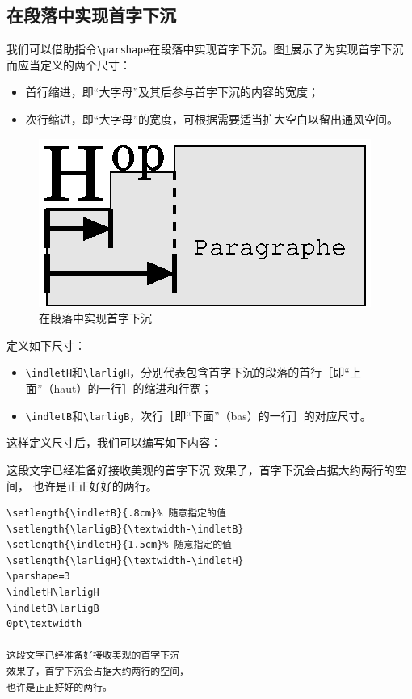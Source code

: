 \subsection{在段落中实现首字下沉}

我们可以借助指令\verb|\parshape|在段落中实现首字下沉。图\ref{fig:11.3}展示了为实现首字下沉而应当定义的两个尺寸：

\begin{itemize}
    \item 首行缩进，即“大字母”及其后参与首字下沉的内容的宽度；
    \item 次行缩进，即“大字母”的宽度，可根据需要适当扩大空白以留出通风空间。
\end{itemize}

\begin{figure}[ht]
    \begin{center}
      \includegraphics{img/lettrine}
    \end{center}
    \caption{在段落中实现首字下沉}
    \label{fig:11.3}
\end{figure}

定义如下尺寸：

\begin{itemize}
\item \verb|\indletH|和\verb|\larligH|，分别代表包含首字下沉的段落的首行［即“上面”（haut）的一行］的缩进和行宽；
\item \verb|\indletB|和\verb|\larligB|，次行［即“下面”（bas）的一行］的对应尺寸。
\end{itemize}

这样定义尺寸后，我们可以编写如下内容：

\begin{codelist}[11/23]{
\newlength{\indletB}
\newlength{\indletH}
\newlength{\larligB}
\newlength{\larligH}
\setlength{\indletB}{.8cm}%
\setlength{\larligB}{\textwidth-\indletB}
\setlength{\indletH}{1.5cm}%
\setlength{\larligH}{\textwidth-\indletH}
\indletH\larligH
\indletB\larligB
0pt\textwidth
这段文字已经准备好接收美观的首字下沉
效果了，首字下沉会占据大约两行的空间，
也许是正正好好的两行。
}\begin{verbatim}
\setlength{\indletB}{.8cm}% 随意指定的值
\setlength{\larligB}{\textwidth-\indletB}
\setlength{\indletH}{1.5cm}% 随意指定的值
\setlength{\larligH}{\textwidth-\indletH}
\parshape=3
\indletH\larligH
\indletB\larligB
0pt\textwidth

这段文字已经准备好接收美观的首字下沉
效果了，首字下沉会占据大约两行的空间，
也许是正正好好的两行。
\end{verbatim}
\end{codelist}

